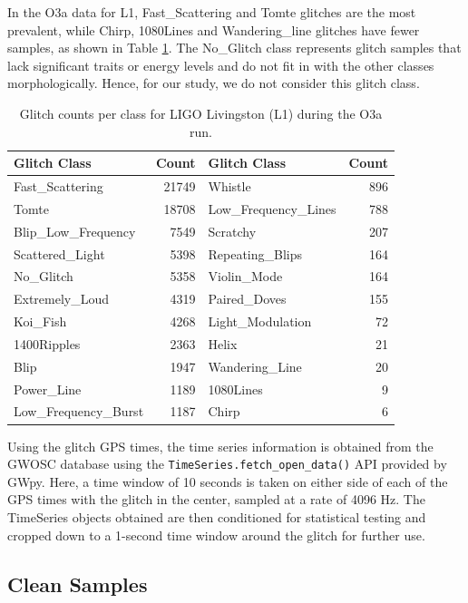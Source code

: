 \documentclass[12pt]{article}
\begin{document}
\medskip
\noindent In the O3a data for L1, Fast\_Scattering and Tomte glitches are the most prevalent, while Chirp, 1080Lines and Wandering\_line glitches have fewer samples, as shown in Table \ref{tab:glitch_classes}. The No\_Glitch class represents glitch samples that lack significant traits or energy levels and do not fit in with the other classes morphologically. Hence, for our study, we do not consider this glitch class.

\begin{table}[H]
    \centering
    \begin{tabular}{lr|lr}
    \toprule
    Glitch Class & Count & Glitch Class & Count \\
    \midrule
    Fast\_Scattering & 21749 & Whistle & 896 \\
    Tomte & 18708 & Low\_Frequency\_Lines & 788\\
    Blip\_Low\_Frequency & 7549 & Scratchy & 207 \\
    Scattered\_Light & 5398 & Repeating\_Blips & 164 \\
    No\_Glitch & 5358 & Violin\_Mode & 164 \\
    Extremely\_Loud & 4319 & Paired\_Doves & 155 \\
    Koi\_Fish & 4268 & Light\_Modulation & 72 \\
    1400Ripples & 2363 & Helix & 21 \\
    Blip & 1947 & Wandering\_Line & 20 \\
    Power\_Line & 1189 & 1080Lines & 9 \\
    Low\_Frequency\_Burst & 1187 & Chirp & 6 \\
    \bottomrule
    \end{tabular}
    \caption{Glitch counts per class for LIGO Livingston (L1) during the O3a run.}
    \label{tab:glitch_classes}
\end{table}

\pagebreak
\noindent Using the glitch GPS times, the time series information is obtained from the GWOSC database using the \texttt{TimeSeries.fetch\_open\_data()} API provided by GWpy. Here, a time window of 10 seconds is taken on either side of each of the GPS times with the glitch in the center, sampled at a rate of 4096 Hz. The TimeSeries objects obtained are then conditioned for statistical testing and cropped down to a 1-second time window around the glitch for further use.

\subsection{Clean Samples}\label{Cleandata}
\end{document}
